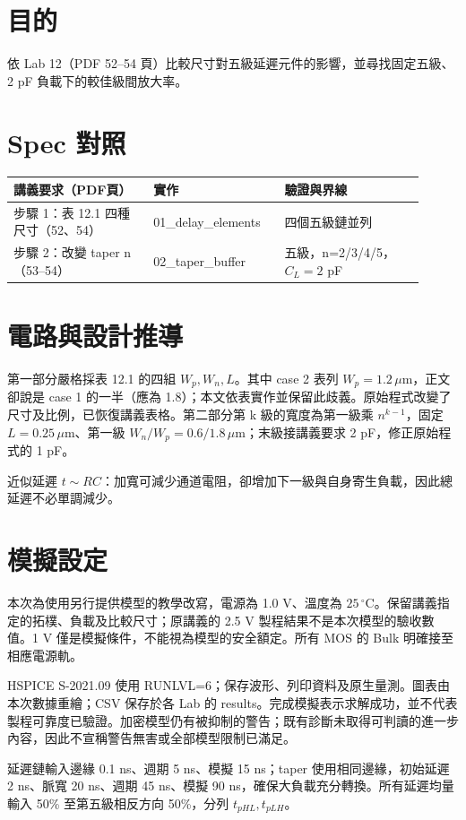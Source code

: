 \section{目的}
依 Lab 12（PDF 52--54 頁）比較尺寸對五級延遲元件的影響，並尋找固定五級、2 pF 負載下的較佳級間放大率。

\section{Spec 對照}
\begin{longtable}{p{0.31\linewidth}p{0.29\linewidth}p{0.31\linewidth}}
\toprule
講義要求（PDF頁） & 實作 & 驗證與界線 \\\midrule
步驟 1：表 12.1 四種尺寸（52、54） & 01\_delay\_elements & 四個五級鏈並列 \\
步驟 2：改變 taper n（53--54） & 02\_taper\_buffer & 五級，n=2/3/4/5，$C_L=2$ pF \\
\bottomrule
\end{longtable}


\section{電路與設計推導}
第一部分嚴格採表 12.1 的四組 $W_p,W_n,L$。其中 case 2 表列 $W_p=1.2\,\mu$m，正文卻說是 case 1 的一半（應為 1.8）；本文依表實作並保留此歧義。原始程式改變了尺寸及比例，已恢復講義表格。第二部分第 k 級的寬度為第一級乘 $n^{k-1}$，固定 $L=0.25\,\mu$m、第一級 $W_n/W_p=0.6/1.8\,\mu$m；末級接講義要求 2 pF，修正原始程式的 1 pF。

近似延遲 $t\sim RC$：加寬可減少通道電阻，卻增加下一級與自身寄生負載，因此總延遲不必單調減少。

\section{模擬設定}
本次為使用另行提供模型的教學改寫，電源為 1.0 V、溫度為 $25\,^{\circ}\mathrm C$。保留講義指定的拓樸、負載及比較尺寸；原講義的 2.5 V 製程結果不是本次模型的驗收數值。1 V 僅是模擬條件，不能視為模型的安全額定。所有 MOS 的 Bulk 明確接至相應電源軌。

HSPICE S-2021.09 使用 RUNLVL=6；保存波形、列印資料及原生量測。圖表由本次數據重繪；CSV 保存於各 Lab 的 results。完成模擬表示求解成功，並不代表製程可靠度已驗證。加密模型仍有被抑制的警告；既有診斷未取得可判讀的進一步內容，因此不宣稱警告無害或全部模型限制已滿足。

延遲鏈輸入邊緣 0.1 ns、週期 5 ns、模擬 15 ns；taper 使用相同邊緣，初始延遲 2 ns、脈寬 20 ns、週期 45 ns、模擬 90 ns，確保大負載充分轉換。所有延遲均量輸入 50\% 至第五級相反方向 50\%，分列 $t_{pHL},t_{pLH}$。

